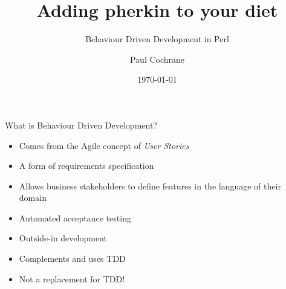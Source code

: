\documentclass[10pt]{vcs_beamer}
\begin{document}
\author{Paul Cochrane}
\title{Adding pherkin to your diet}
\subtitle{Behaviour Driven Development in Perl}
\date{\today}

\maketitle

\begin{frame}{What is Behaviour Driven Development?}

\begin{itemize}
    \item Comes from the Agile concept of \emph{User Stories}
    \item A form of requirements specification
    \item Allows business stakeholders to define features in the language of
        their domain
    \item Automated acceptance testing
    \item Outside-in development
    \item Complements and uses TDD
    \item Not a replacement for TDD!
\end{itemize}

\end{frame}
\end{document}
